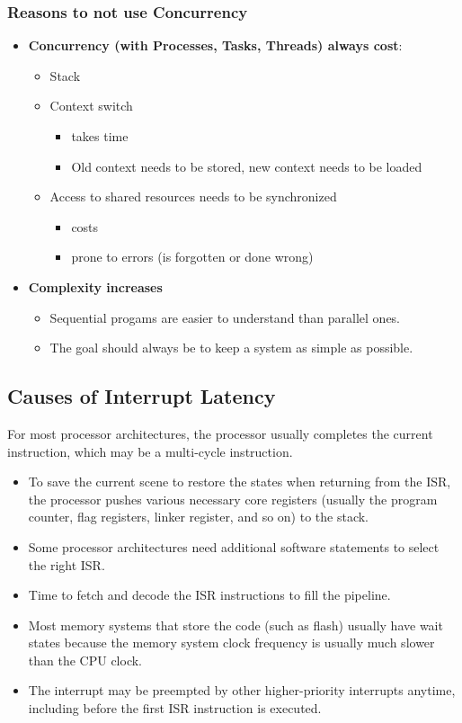 \subsubsection{Reasons to not use Concurrency}
\begin{itemize}
  \item \textbf{Concurrency (with Processes, Tasks, Threads) always cost}:
        \begin{itemize}
          \item Stack
          \item Context switch
                \begin{itemize}
                  \item takes time
                  \item Old context needs to be stored, new context needs to be loaded
                \end{itemize}
          \item Access to shared resources needs to be synchronized
                \begin{itemize}
                  \item costs
                  \item prone to errors (is forgotten or done wrong)
                \end{itemize}
        \end{itemize}
  \item \textbf{Complexity increases}
        \begin{itemize}
          \item Sequential progams are easier to understand than parallel ones.
          \item The goal should always be to keep a system as simple as possible.
        \end{itemize}
\end{itemize}

\subsection{Causes of Interrupt Latency}
For most processor architectures, the processor usually completes the current instruction, which may be a multi-cycle instruction.
\begin{itemize}
  \item To save the current scene to restore the states when returning from the ISR, the processor pushes various necessary core registers (usually the program counter, flag registers, linker register, and so on) to the stack.
  \item Some processor architectures need additional software statements to select the right ISR.
  \item Time to fetch and decode the ISR instructions to fill the pipeline.
  \item Most memory systems that store the code (such as flash) usually have wait states because the memory system clock frequency is usually much slower than the CPU clock.
  \item The interrupt may be preempted by other higher-priority interrupts anytime, including before the first ISR instruction is executed.
\end{itemize}


